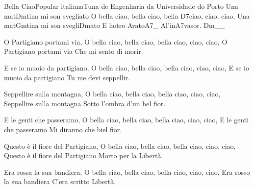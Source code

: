 \begin{musica}{Bella Ciao}{Popular italiana}{Tuna de Engenharia da Universidade do Porto}
Una mat\ac{Dm}{ti}na mi son svegliato
O bella ciao, bella ciao, bella \ac{D7}{ciao}, ciao, ciao,
Una mat\ac{Gm}{ti}na mi son svegli\ac{Dm}{ato}
E hotro \ac{A}{va}to\ac{A7}{}_ \ac{A}{l’i}n\ac{A7}{va}sor. \ac{Dm}{}__

O Partigiano portami via,
O bella ciao, bella ciao, bella ciao, ciao, ciao,
O Partigiano portami via
Che mi sento di morir.

E se io muoio da partigiano,
O bella ciao, bella ciao, bella ciao, ciao, ciao,
E se io muoio da partigiano
Tu me devi seppellir.

Seppellire sulla montagna,
O bella ciao, bella ciao, bella ciao, ciao, ciao,
Seppellire sulla montagna
Sotto l’ombra d’un bel fior.

E le genti che passeramo,
O bella ciao, bella ciao, bella ciao, ciao, ciao,
E le genti che passeramo
Mi diranno che biel fior.

Questo è il fiore del Partigiano,
O bella ciao, bella ciao, bella ciao, ciao, ciao,
Questo è il fiore del Partigiano
Morto per la Libertà.

Era rossa la sua bandiera,
O bella ciao, bella ciao, bella ciao, ciao, ciao,
Era rosso la sua bandiera
C’era scritto Libertà.

\end{musica}

